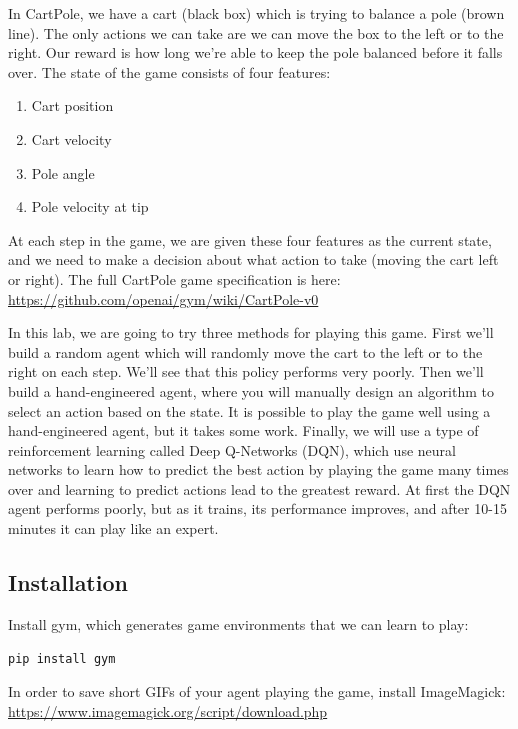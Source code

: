 \documentclass{article}
\begin{document}
In CartPole, we have a cart (black box) which is trying to balance a pole (brown line). The only actions we can take are we can move the box to the left or to the right. Our reward is how long we're able to keep the pole balanced before it falls over. The state of the game consists of four features:

\begin{enumerate}
    \item Cart position
    \item Cart velocity
    \item Pole angle
    \item Pole velocity at tip
\end{enumerate}

\noindent
At each step in the game, we are given these four features as the current state, and we need to make a decision about what action to take (moving the cart left or right). The full CartPole game specification is here: \url{https://github.com/openai/gym/wiki/CartPole-v0}

In this lab, we are going to try three methods for playing this game. First we'll build a random agent which will randomly move the cart to the left or to the right on each step. We'll see that this policy performs very poorly. Then we'll build a hand-engineered agent, where you will manually design an algorithm to select an action based on the state. It is possible to play the game well using a hand-engineered agent, but it takes some work. Finally, we will use a type of reinforcement learning called Deep Q-Networks (DQN), which use neural networks to learn how to predict the best action by playing the game many times over and learning to predict actions lead to the greatest reward. At first the DQN agent performs poorly, but as it trains, its performance improves, and after 10-15 minutes it can play like an expert.

\subsection{Installation}

Install gym, which generates game environments that we can learn to play:

\vspace{2mm}

\noindent
\texttt{pip install gym}

\vspace{2mm}

In order to save short GIFs of your agent playing the game, install ImageMagick: \url{https://www.imagemagick.org/script/download.php}
\end{document}
